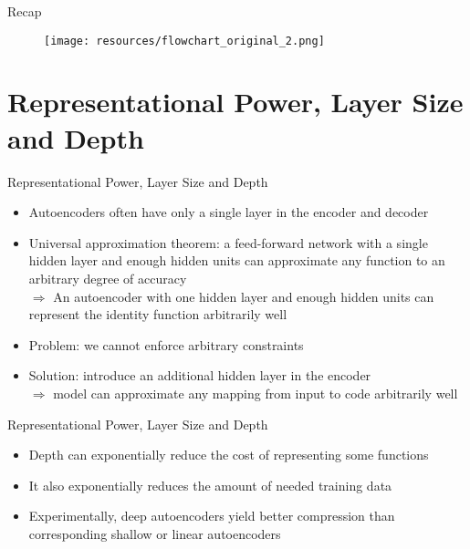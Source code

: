 \documentclass[handout]{beamer}
\begin{document}
\begin{frame}[t]{Recap}
   \begin{figure}[h]
       \centering
       \texttt{[image: resources/flowchart\_original\_2.png]}
   \end{figure} 
\end{frame}

\section{Representational Power, Layer Size and Depth}
\begin{frame}[t]{Representational Power, Layer Size and Depth}
    \begin{itemize}
\item Autoencoders often have only a single layer in the encoder and decoder
\pause
     \item Universal approximation theorem: a feed-forward network with a single hidden layer and enough hidden units can approximate any function to an arbitrary degree of accuracy\\
\pause
    $\Rightarrow$ An autoencoder with one hidden layer and enough hidden units can represent the identity function arbitrarily well
\pause
    \item Problem: we cannot enforce arbitrary constraints
\pause
    \item Solution: introduce an additional hidden layer in the encoder \\ $\Rightarrow$ model can approximate any mapping from input to code arbitrarily well

    \end{itemize}    
\end{frame}

\begin{frame}[t]{Representational Power, Layer Size and Depth}
    \begin{itemize}
        \item Depth can exponentially reduce the cost of representing some functions
\pause
        \item It also exponentially reduces the amount of needed training data
\pause
        \item Experimentally, deep autoencoders yield better compression than corresponding shallow or linear autoencoders
    \end{itemize}    
\end{frame}
\end{document}
